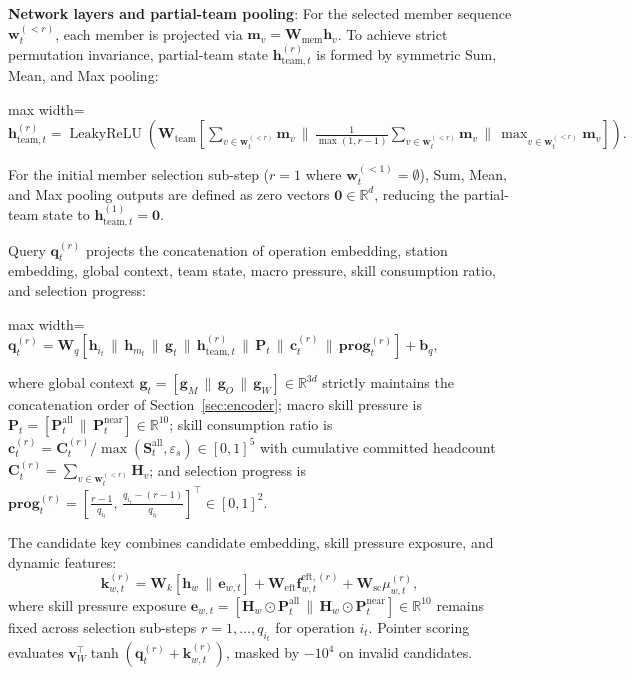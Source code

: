 \documentclass[journal,10pt]{IEEEtran}
\begin{document}
\textbf{Network layers and partial-team pooling}:
For the selected member sequence $\mathbf w_t^{(<r)}$, each member is projected via $\mathbf m_v = \mathbf W_{\mathrm{mem}}\mathbf h_v$. To achieve strict permutation invariance, partial-team state $\mathbf h_{\mathrm{team},t}^{(r)}$ is formed by symmetric Sum, Mean, and Max pooling:
\begin{center}
\begin{adjustbox}{max width=\columnwidth}
$\displaystyle
\mathbf h_{\mathrm{team},t}^{(r)} = \operatorname{LeakyReLU}\left(\mathbf W_{\mathrm{team}} \left[\sum_{v\in \mathbf w_t^{(<r)}} \mathbf m_v \,\|\, \frac{1}{\max(1, r-1)}\sum_{v\in \mathbf w_t^{(<r)}} \mathbf m_v \,\|\, \max_{v\in \mathbf w_t^{(<r)}} \mathbf m_v\right]\right).
$
\end{adjustbox}
\end{center}
For the initial member selection sub-step ($r=1$ where $\mathbf w_t^{(<1)}=\emptyset$), Sum, Mean, and Max pooling outputs are defined as zero vectors $\mathbf 0\in\mathbb R^d$, reducing the partial-team state to $\mathbf h_{\mathrm{team},t}^{(1)}=\mathbf 0$.

Query $\mathbf q_t^{(r)}$ projects the concatenation of operation embedding, station embedding, global context, team state, macro pressure, skill consumption ratio, and selection progress:
\begin{center}
\begin{adjustbox}{max width=\columnwidth}
$\displaystyle
\mathbf q_t^{(r)}=\mathbf W_q\left[\mathbf h_{i_t}\,\|\,\mathbf h_{m_t}\,\|\,\mathbf g_t\,\|\,\mathbf h_{\mathrm{team},t}^{(r)}\,\|\,\mathbf P_t\,\|\,\mathbf c_t^{(r)}\,\|\,\mathbf{prog}_t^{(r)}\right]+\mathbf b_q,
$
\end{adjustbox}
\end{center}
where global context $\mathbf g_t = [\mathbf g_M \,\|\, \mathbf g_O \,\|\, \mathbf g_W] \in \mathbb R^{3d}$ strictly maintains the concatenation order of Section~\ref{sec:encoder}; macro skill pressure is $\mathbf P_t = [\mathbf P_t^{\mathrm{all}} \,\|\, \mathbf P_t^{\mathrm{near}}] \in \mathbb R^{10}$; skill consumption ratio is $\mathbf c_t^{(r)} = \mathbf C_t^{(r)} / \max(\mathbf S_t^{\mathrm{all}}, \varepsilon_s) \in [0,1]^5$ with cumulative committed headcount $\mathbf C_t^{(r)} = \sum_{v\in\mathbf w_t^{(<r)}} \mathbf H_v$; and selection progress is $\mathbf{prog}_t^{(r)} = \left[\frac{r-1}{q_{i_t}},\, \frac{q_{i_t}-(r-1)}{q_{i_t}}\right]^\top \in [0,1]^2$.

The candidate key combines candidate embedding, skill pressure exposure, and dynamic features:
\begin{equation}
\mathbf k_{w,t}^{(r)}=\mathbf W_k[\mathbf h_w\,\|\,\mathbf e_{w,t}]+\mathbf W_{\mathrm{eft}}\mathbf f_{w,t}^{\mathrm{eft},(r)}+\mathbf W_{\mathrm{sc}}\mu_{w,t}^{(r)},
\end{equation}
where skill pressure exposure $\mathbf e_{w,t} = [\mathbf H_w \odot \mathbf P_t^{\mathrm{all}} \,\|\, \mathbf H_w \odot \mathbf P_t^{\mathrm{near}}] \in \mathbb R^{10}$ remains fixed across selection sub-steps $r=1,\dots,q_{i_t}$ for operation $i_t$. Pointer scoring evaluates $\mathbf v_W^{\top}\tanh(\mathbf q_t^{(r)}+\mathbf k_{w,t}^{(r)})$, masked by $-10^4$ on invalid candidates.
\end{document}
